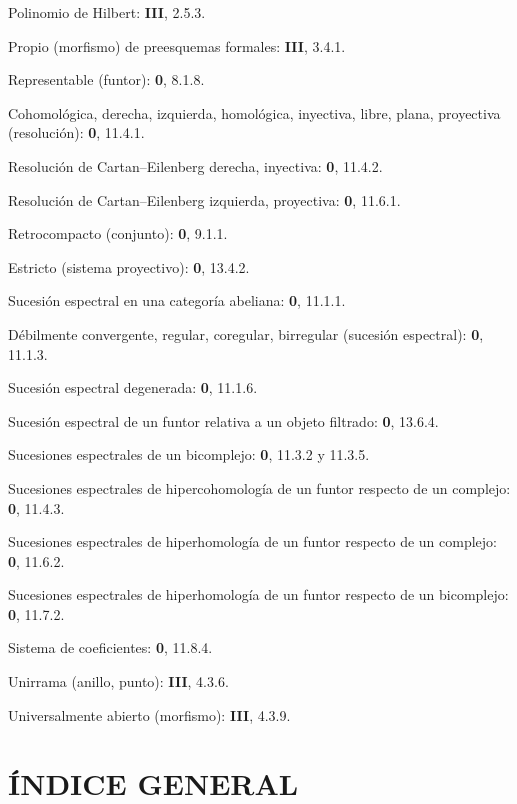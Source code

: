 \begin{flushleft}
Polinomio de Hilbert: \textbf{III}, 2.5.3.

Propio (morfismo) de preesquemas formales: \textbf{III}, 3.4.1.

Representable (funtor): \textbf 0, 8.1.8.

Cohomológica, derecha, izquierda, homológica, inyectiva, libre, plana, proyectiva
(resolución): \textbf 0, 11.4.1.

Resolución de Cartan--Eilenberg derecha, inyectiva: \textbf 0, 11.4.2.

Resolución de Cartan--Eilenberg izquierda, proyectiva: \textbf 0, 11.6.1.

Retrocompacto (conjunto): \textbf 0, 9.1.1.

Estricto (sistema proyectivo): \textbf 0, 13.4.2.

Sucesión espectral en una categoría abeliana: \textbf 0, 11.1.1.

Débilmente convergente, regular, coregular, birregular (sucesión espectral):
\textbf 0, 11.1.3.

Sucesión espectral degenerada: \textbf 0, 11.1.6.

Sucesión espectral de un funtor relativa a un objeto filtrado: \textbf 0, 13.6.4.

Sucesiones espectrales de un bicomplejo: \textbf 0, 11.3.2 y 11.3.5.

Sucesiones espectrales de hipercohomología de un funtor respecto de un complejo:
\textbf 0, 11.4.3.

Sucesiones espectrales de hiperhomología de un funtor respecto de un complejo:
\textbf 0, 11.6.2.

Sucesiones espectrales de hiperhomología de un funtor respecto de un bicomplejo:
\textbf 0, 11.7.2.

Sistema de coeficientes: \textbf 0, 11.8.4.

Unirrama (anillo, punto): \textbf{III}, 4.3.6.

Universalmente abierto (morfismo): \textbf{III}, 4.3.9.
\end{flushleft}

\clearpage
{}
\section*{ÍNDICE GENERAL}

